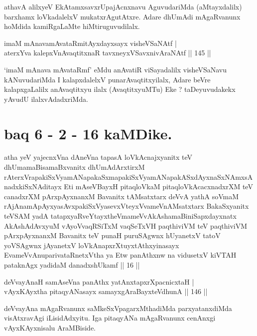 \begin{artha}
athavA alilxyeV EkAtamxsavxrUpajAcnxnavu AguvudariMda (aMtayxdalilx)
barxhamx loVkadalelxV mukatxrAgutAtxre. Adare dhUmAdi mAgaRvanunx
hoMdida kamiRgaLaMte hiMtiruguvudilalx.
\end{artha}


\begin{shl}
imaM mAnavamAvataRmitAyxdayxsayx visheVSaNAtf | \\
aterxYva kalepxV\s nAvaqtitxnaR tavxneyxVSavxnivAraNAtf \hfill|| 145 || 
\end{shl}

\begin{artha}
`imaM mAnava mAvataRmf' eMdu anAvatiR viSayadalilx visheVSaNavu  kANuvudariMda I kalapxdalelxV punarAvaqtitxyilalx, Adare beVre  kalapxgaLalilx anAvaqtitx\-yu ilalx (AvaqtitxyuMTu) Eke ? taDeyuvudakekx  yAvudU ilalxvAdadxriMda.
\end{artha}

\section*{baq 6 - 2 - 16 kaMDike.}

\begin{shl}
atha yeV yajecnxVna dAneVna tapasA loVkAcnajxyanitx teV dhUmamaBisamaBxvanitx dhUmAdArxtirxM rAterxVrapakiSxVyamANapakaSxmapakiSxVyamANapakASxdAyxnaSxNAmxsAnadxkiSxNAditayx Eti mAseVBayxH pitaqloVkaM pitaqloVkAcacxnadxrXM teV canadxrXM pArxpAyxnanxM Bavanitx tAMsatxtarx deVvA yathA soVmaM rAjAnamApAyxyasAvxpakiSxVyasevxVteyxVvameVnAMsatxtarx BakaSxyanitx teVSAM yadA tatapxyaRveYtayxtheVmameVvAkAshamaBiniSapxdayxnatx AkAshAdAvxyuM vAyoVvaqRSiTxM vaqSeTxVH paqthiviVM teV paqthiviVM pArxpAyxnanxM Bavanitx teV punaH puruSAgwnx hUyanetxV tatoV yoVSAgwnx jAyanetxV loVkAnapxrXtuyxtAthxyinasayx EvameVvAnuparivataRnetxV\s tha ya Etw panAthxnw na vidusetxV kiVTAH pataknAgx yadidaM danadxshUkamf || 16 ||
\end{shl}

\begin{shl}
deVvayAnaH samAseVna panAthx yatAnxtapxrXpacnicxtaH | \\
vAyxKAyx\s tha pitaqyANasayx samayxgAraBayxteV\s dhunA \hfill|| 146 || 
\end{shl}

\begin{artha}
deVvayAna mAgaRvanunx saMkeSxVpagarxMthadiMda parxyatanxdiMda
visAtxravAgi iLisidAdxyitu. Iga pitaqyANa mAgaRvanunx cenAnxgi
vAyxKAyxnisalu AraMBiside.
\end{artha}

